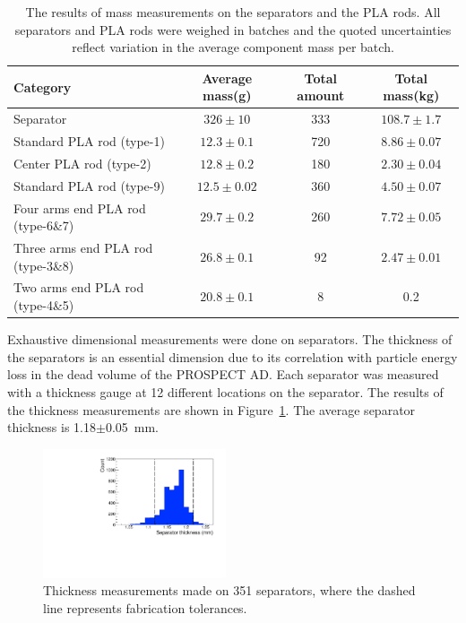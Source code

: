 \begin{table}[htpb]
\centering
\caption[Mass of the optical grid components]{The results of mass measurements on the separators and the PLA rods. 
All separators and PLA rods were weighed in batches and the quoted uncertainties reflect variation in the average component mass per batch.}
\begin{tabular}{p{5cm}ccc}
\hline
\hline
Category & Average mass(g) & Total amount & Total mass(kg)\\
\hline
Separator & $326\pm10$ & 333 & $108.7\pm1.7$\\
Standard PLA rod (type-1) & $12.3\pm0.1$ & 720 & $8.86\pm0.07$\\
Center PLA rod (type-2) & $12.8\pm0.2$ & 180 & $2.30\pm0.04$\\
Standard PLA rod (type-9) & $12.5\pm0.02$ & 360 & $4.50\pm0.07$\\
Four arms end PLA rod (type-6\&7)& $29.7\pm0.2$ & 260 & $7.72\pm0.05$ \\
Three arms end PLA rod (type-3\&8)& $26.8\pm0.1$ & 92 & $2.47\pm0.01$\\
Two arms end PLA rod (type-4\&5) & $20.8\pm0.1$ & 8 & 0.2\\
\hline
\end{tabular}

\label{tab:mass}
\end{table}

Exhaustive dimensional measurements were done on separators. 
The thickness of the separators is an essential dimension due to its correlation with particle energy loss in the dead volume of the PROSPECT AD.
Each separator was measured with a thickness gauge at 12 different locations on the separator. 
The results of the thickness measurements are shown in Figure~\ref{fig:panelMeasure}.
The average separator thickness is 1.18$\pm$0.05~mm.

\begin{figure}[h!]
\centering
\includegraphics[width=0.48\textwidth]{Figures/PanelThick351.pdf}
\caption[Thickness of separators]{Thickness measurements made on 351 separators, where  the dashed line represents fabrication tolerances. }
\label{fig:panelMeasure}
\end{figure}

